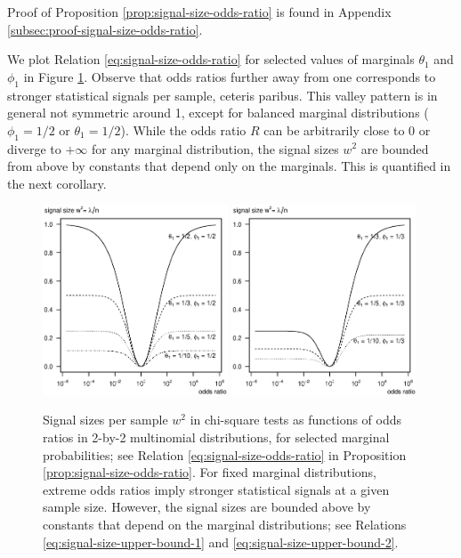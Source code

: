 Proof of Proposition \ref{prop:signal-size-odds-ratio} is found in Appendix \ref{subsec:proof-signal-size-odds-ratio}. 

We plot Relation \eqref{eq:signal-size-odds-ratio} for selected values of marginals $\theta_1$ and $\phi_1$ in Figure \ref{fig:signal-vs-odds}.
Observe that odds ratios further away from one corresponds to stronger statistical signals per sample, ceteris paribus.
This valley pattern is in general not symmetric around 1, except for balanced marginal distributions ($\phi_1=1/2$ or $\theta_1=1/2$).
While the odds ratio $R$ can be arbitrarily close to 0 or diverge to $+\infty$ for any marginal distribution, the signal sizes $w^2$ are bounded from above by constants that depend only on the marginals.
This is quantified in the next corollary.

\begin{figure}
      \centering
      \includegraphics[width=0.49\textwidth]{./singal-vs-odds-p05}
      \includegraphics[width=0.49\textwidth]{./singal-vs-odds-p0333}            
      \caption{Signal sizes per sample $w^2$ in chi-square tests as functions of odds ratios in 2-by-2 multinomial distributions, for selected marginal probabilities; see Relation \eqref{eq:signal-size-odds-ratio} in Proposition \ref{prop:signal-size-odds-ratio}.
      For fixed marginal distributions, extreme odds ratios imply stronger statistical signals at a given sample size.
      However, the signal sizes are bounded above by constants that depend on the marginal distributions; see Relations \eqref{eq:signal-size-upper-bound-1} and \eqref{eq:signal-size-upper-bound-2}.
      } 
      \label{fig:signal-vs-odds}
\end{figure}


